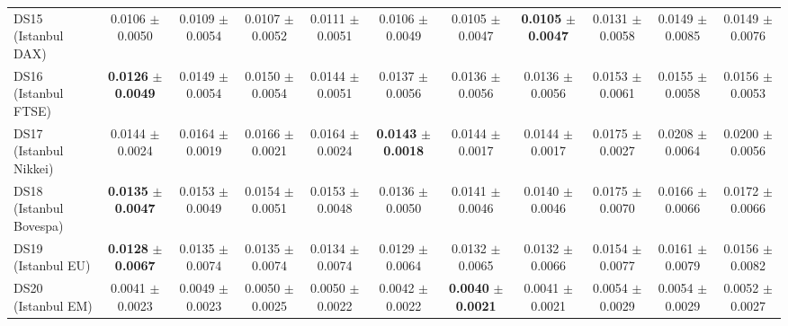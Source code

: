 \begin{table}[t]
{{\begin{tabular}{lcccccccccc}
DS15 (Istanbul DAX) & 0.0106 $\pm$ 0.0050 & 0.0109 $\pm$ 0.0054 & 0.0107 $\pm$ 0.0052 & 0.0111 $\pm$ 0.0051 & 0.0106 $\pm$ 0.0049 & 0.0105 $\pm$ 0.0047 & \textbf{0.0105} $\pm$ \textbf{0.0047} & 0.0131 $\pm$ 0.0058 & 0.0149 $\pm$ 0.0085 & 0.0149 $\pm$ 0.0076 \\
DS16 (Istanbul FTSE) & \textbf{0.0126} $\pm$ \textbf{0.0049} & 0.0149 $\pm$ 0.0054 & 0.0150 $\pm$ 0.0054 & 0.0144 $\pm$ 0.0051 & 0.0137 $\pm$ 0.0056 & 0.0136 $\pm$ 0.0056 & 0.0136 $\pm$ 0.0056 & 0.0153 $\pm$ 0.0061 & 0.0155 $\pm$ 0.0058 & 0.0156 $\pm$ 0.0053 \\
DS17 (Istanbul Nikkei) & 0.0144 $\pm$ 0.0024 & 0.0164 $\pm$ 0.0019 & 0.0166 $\pm$ 0.0021 & 0.0164 $\pm$ 0.0024 & \textbf{0.0143} $\pm$ \textbf{0.0018} & 0.0144 $\pm$ 0.0017 & 0.0144 $\pm$ 0.0017 & 0.0175 $\pm$ 0.0027 & 0.0208 $\pm$ 0.0064 & 0.0200 $\pm$ 0.0056 \\
DS18 (Istanbul Bovespa) & \textbf{0.0135} $\pm$ \textbf{0.0047} & 0.0153 $\pm$ 0.0049 & 0.0154 $\pm$ 0.0051 & 0.0153 $\pm$ 0.0048 & 0.0136 $\pm$ 0.0050 & 0.0141 $\pm$ 0.0046 & 0.0140 $\pm$ 0.0046 & 0.0175 $\pm$ 0.0070 & 0.0166 $\pm$ 0.0066 & 0.0172 $\pm$ 0.0066 \\
DS19 (Istanbul EU) & \textbf{0.0128} $\pm$ \textbf{0.0067} & 0.0135 $\pm$ 0.0074 & 0.0135 $\pm$ 0.0074 & 0.0134 $\pm$ 0.0074 & 0.0129 $\pm$ 0.0064 & 0.0132 $\pm$ 0.0065 & 0.0132 $\pm$ 0.0066 & 0.0154 $\pm$ 0.0077 & 0.0161 $\pm$ 0.0079 & 0.0156 $\pm$ 0.0082 \\
DS20 (Istanbul EM) & 0.0041 $\pm$ 0.0023 & 0.0049 $\pm$ 0.0023 & 0.0050 $\pm$ 0.0025 & 0.0050 $\pm$ 0.0022 & 0.0042 $\pm$ 0.0022 & \textbf{0.0040} $\pm$ \textbf{0.0021} & 0.0041 $\pm$ 0.0021 & 0.0054 $\pm$ 0.0029 & 0.0054 $\pm$ 0.0029 & 0.0052 $\pm$ 0.0027 \\
\bottomrule
\end{tabular}%
}%
}
\end{table}
